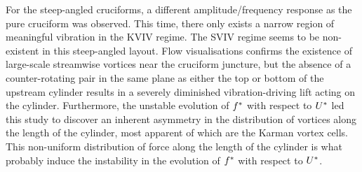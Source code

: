 \documentclass[oneside]{utmthesis}
\begin{document}

For the steep-angled cruciforms, a different amplitude/frequency response as the pure cruciform was observed. This time, there only exists a narrow region of meaningful vibration in the KVIV regime. The SVIV regime seems to be non-existent in this steep-angled layout. Flow visualisations confirms the existence of large-scale streamwise vortices near the cruciform juncture, but the absence of a counter-rotating pair in the same plane as either the top or bottom of the upstream cylinder results in a severely diminished vibration-driving lift acting on the cylinder. Furthermore, the unstable evolution of $f^{*}$ with respect to $U^{*}$ led this study to discover an inherent asymmetry in the distribution of vortices along the length of the cylinder, most apparent of which are the Karman vortex cells. This non-uniform distribution of force along the length of the cylinder is what probably induce the instability in the evolution of $f^{*}$ with respect to $U^{*}$.
\end{document}
